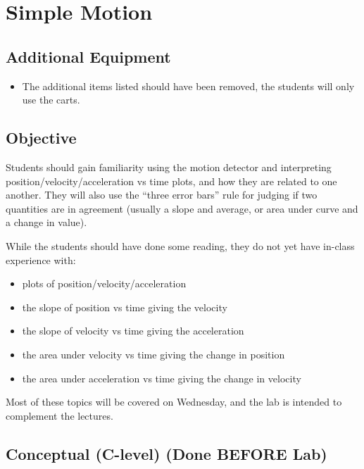 \documentclass[fleqn,letterpaper]{article}
\begin{document}
\cfoot{}
\headsep=25pt

\section*{Simple Motion}

\subsection*{Additional Equipment}

\begin{itemize}
  \item{The additional items listed should have been removed, the students will only use the carts.}
\end{itemize}

\subsection*{Objective}

Students should gain familiarity using the motion detector and interpreting position/velocity/acceleration vs time plots, and how they are related to one another.  They will also use the ``three error bars'' rule for judging if two quantities are in agreement (usually a slope and average, or area under curve and a change in value).

While the students should have done some reading, they do not yet have in-class experience with:
\begin{itemize}
 \item{plots of position/velocity/acceleration}
 \item{the slope of position vs time giving the velocity}
 \item{the slope of velocity vs time giving the acceleration}
 \item{the area under velocity vs time giving the change in position}
 \item{the area under acceleration vs time giving the change in velocity}
\end{itemize}

Most of these topics will be covered on Wednesday, and the lab is intended to complement the lectures.

\subsection*{Conceptual (C-level) (Done BEFORE Lab)}
\end{document}

